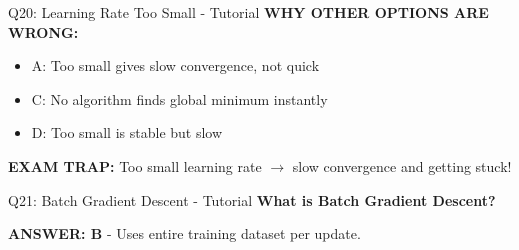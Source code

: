 \documentclass[8pt]{beamer}
\begin{document}
\begin{frame}{Q20: Learning Rate Too Small - Tutorial}
		\vspace{0.05cm}
		\textcolor{myred}{\textbf{WHY OTHER OPTIONS ARE WRONG:}}
		\begin{itemize}
			\item \textcolor{myred}{A:} Too small gives slow convergence, not quick
			\item \textcolor{myred}{C:} No algorithm finds global minimum instantly
			\item \textcolor{myred}{D:} Too small is stable but slow
		\end{itemize}
		
		\textcolor{myred}{\textbf{EXAM TRAP:}} Too small learning rate $\rightarrow$ \textcolor{myred}{slow convergence and getting stuck}!
	\end{frame}
	
	\begin{frame}{Q21: Batch Gradient Descent - Tutorial}
		\fontsize{6.5}{7.5}\selectfont
		\textbf{What is Batch Gradient Descent?}
		
		\vspace{0.05cm}
		\textcolor{myblue}{\textbf{ANSWER: B}} - Uses entire training dataset per update.
		

\end{frame}
\end{document}
